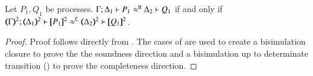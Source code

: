 \begin{proposition}\myrm
	\label{app:prop:fulla_HOp_to_p}
	Let $P_1, Q_1$ be \HOp processes.
	$\Gamma; \Delta_1 \vdash P_1 \approx^\mathtt{H} \Delta_2 \vdash Q_1$
	if and only if
	$\horel{\tmap{\Gamma}{2}}{\tmap{\Delta_1}{2}}{\pmap{P_1}{2}}{\fwb}{\tmap{\Delta_2}{2}}{\pmap{Q_1}{2}}$.
\end{proposition}

\begin{proof}

%
	Proof follows directly from . The cases
	of  are used to create a
	bisimulation closure to prove the the soundness direction and
	a bisimulation up to determinate transition ()
	to prove the
	completeness direction.
\end{proof}




%

